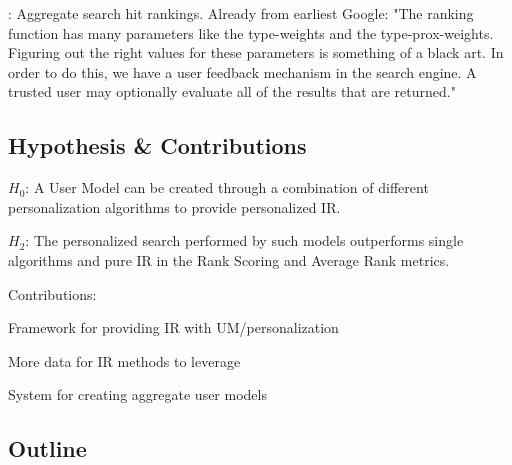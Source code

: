 \cite[p12]{Bender2005}: Aggregate search hit rankings. Already from earliest Google:
"The ranking function has many parameters like the type-weights and the type-prox-weights. Figuring out the right values for these parameters is something of a black art. In order to do this, we have a user feedback mechanism in the search engine. A trusted user may optionally evaluate all of the results that are returned."


\subsection{Hypothesis \& Contributions}

\begin{itemize*}
  \item $H_0$: A User Model can be created through a combination of different personalization algorithms to provide personalized IR.
  \item $H_2$: The personalized search performed by such models outperforms single algorithms and pure IR in the Rank Scoring and Average Rank metrics.
\end{itemize*}

Contributions:

\begin{itemize*}
  \item Framework for providing IR with UM/personalization
  \item More data for IR methods to leverage
  \item System for creating aggregate user models
\end{itemize*}



\subsection{Outline}
